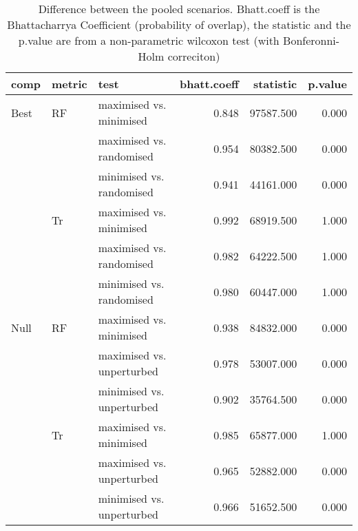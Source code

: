 \begin{table}[ht]
\centering
\begin{tabular}{lllrrr}
  \hline
comp & metric & test & bhatt.coeff & statistic & p.value \\ 
  \hline
Best & RF & maximised vs. minimised & 0.848 & 97587.500 & 0.000 \\ 
   &  & maximised vs. randomised & 0.954 & 80382.500 & 0.000 \\ 
   &  & minimised vs. randomised & 0.941 & 44161.000 & 0.000 \\ 
   & Tr & maximised vs. minimised & 0.992 & 68919.500 & 1.000 \\ 
   &  & maximised vs. randomised & 0.982 & 64222.500 & 1.000 \\ 
   &  & minimised vs. randomised & 0.980 & 60447.000 & 1.000 \\ 
  Null & RF & maximised vs. minimised & 0.938 & 84832.000 & 0.000 \\ 
   &  & maximised vs. unperturbed & 0.978 & 53007.000 & 0.000 \\ 
   &  & minimised vs. unperturbed & 0.902 & 35764.500 & 0.000 \\ 
   & Tr & maximised vs. minimised & 0.985 & 65877.000 & 1.000 \\ 
   &  & maximised vs. unperturbed & 0.965 & 52882.000 & 0.000 \\ 
   &  & minimised vs. unperturbed & 0.966 & 51652.500 & 0.000 \\ 
   \hline
\end{tabular}
\caption{Difference between the pooled scenarios. Bhatt.coeff is the Bhattacharrya Coefficient (probability of overlap), the statistic and the p.value are from a non-parametric wilcoxon test (with Bonferonni-Holm correciton)} 
\label{Full_Tab_pooledscenarios_test}
\end{table}
